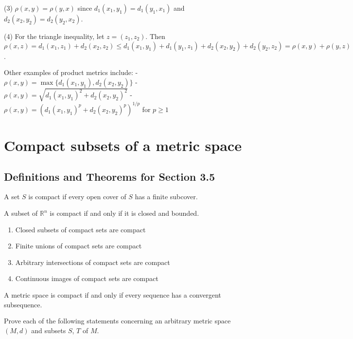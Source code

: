 (3) $\rho(x,y) = \rho(y,x)$ since $d_1(x_1,y_1) = d_1(y_1,x_1)$ and $d_2(x_2,y_2) = d_2(y_2,x_2)$.

(4) For the triangle inequality, let $z = (z_1,z_2)$. Then $\rho(x,z) = d_1(x_1,z_1) + d_2(x_2,z_2) \leq d_1(x_1,y_1) + d_1(y_1,z_1) + d_2(x_2,y_2) + d_2(y_2,z_2) = \rho(x,y) + \rho(y,z)$.

Other examples of product metrics include:
- $\rho(x,y) = \max\{d_1(x_1,y_1), d_2(x_2,y_2)\}$
- $\rho(x,y) = \sqrt{d_1(x_1,y_1)^2 + d_2(x_2,y_2)^2}$
- $\rho(x,y) = (d_1(x_1,y_1)^p + d_2(x_2,y_2)^p)^{1/p}$ for $p \geq 1$


\section{Compact subsets of a metric space}

\subsection*{Definitions and Theorems for Section 3.5}

\begin{definition}
A set $S$ is compact if every open cover of $S$ has a finite subcover.
\end{definition}

\begin{theorem}
A subset of $\mathbb{R}^n$ is compact if and only if it is closed and bounded.
\end{theorem}

\begin{theorem}
\begin{enumerate}
\item Closed subsets of compact sets are compact
\item Finite unions of compact sets are compact
\item Arbitrary intersections of compact sets are compact
\item Continuous images of compact sets are compact
\end{enumerate}
\end{theorem}

\begin{theorem}
A metric space is compact if and only if every sequence has a convergent subsequence.
\end{theorem}

Prove each of the following statements concerning an arbitrary metric space $(M,d)$ and subsets $S$, $T$ of $M$.

